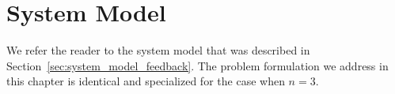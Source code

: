 \section{{System Model}}
\label{sec:system_model_three_users}
We refer the reader to the system model that was described in Section~\ref{sec:system_model_feedback}.  The problem formulation we address in this chapter is identical and specialized for the case when $n = 3$.

%
%
%
%
%
